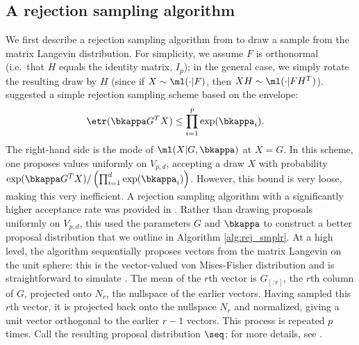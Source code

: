 
\subsection{A rejection  sampling algorithm} \label{sec:prior_sim}

We first describe a rejection sampling algorithm from \cite{hoff2009} to draw a sample from the matrix Langevin distribution.
For simplicity, we assume $F$ is orthonormal (i.e.\ that $H$ equals the identity matrix, $I_p$); in the general case, we simply rotate  the resulting draw 
by $H$ (since if $X \sim \ml(\cdot|F)$, then $XH \sim \ml(\cdot|FH^T)$).
\cite{chikusebook} suggested a simple rejection sampling scheme
based on the envelope:
\begin{align}
  \etr(\bkappa G^T X) & \le \prod_{i=1}^p \exp(\bkappa_i).  \label{eq:chik_bound}
\end{align}
The right-hand side is the mode of $\ml(X|G, \bkappa)$ at $X=G$.
In this scheme, one proposes values uniformly on $V_{p,d}$, accepting a draw $X$ with probability
$\exp(\bkappa G^T X)/\left(\prod_{i=1}^d \exp(\bkappa_i) \right)$.
However, this bound is very loose, making this very inefficient. A rejection sampling algorithm with a significantly
higher acceptance rate was provided in \cite{hoff2009}. Rather than drawing proposals uniformly on $V_{p,d}$, this used the parameters $G$ and
$\bkappa$ to construct a better proposal distribution that we outline in Algorithm \ref{alg:rej_smplr}. At a high level, the algorithm sequentially proposes vectors
from the matrix Langevin on the unit sphere: this is the vector-valued von Mises-Fisher distribution and is straightforward to simulate
\citep{wood1994}.
The mean of the $r${th} vector is $G_{[:r]}$, the $r${th} column of $G$, projected onto $N_r$, the nullspace of the earlier vectors.
Having sampled this $r${th} vector,
it is projected back onto the nullspace $N_r$ and normalized, giving a unit vector orthogonal to the earlier $r-1$ vectors.
This process is repeated $p$ times. Call the resulting
proposal distribution $\seq$; for more details, see \cite{hoff2009}.

